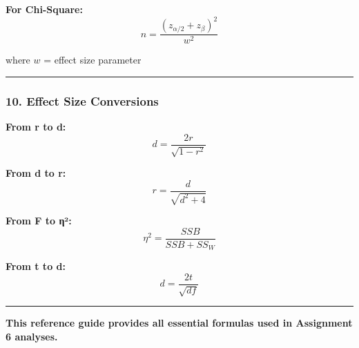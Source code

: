 \documentclass[11pt]{article}
\begin{document}
\textbf{For Chi-Square:} \[n = \frac{(z_{\alpha/2} + z_\beta)^2}{w^2}\]

where \(w\) = effect size parameter

\begin{center}\rule{0.5\linewidth}{0.5pt}\end{center}

\subsubsection{\texorpdfstring{\textbf{10. Effect Size
Conversions}}{10. Effect Size Conversions}}\label{effect-size-conversions}

\textbf{From r to d:} \[d = \frac{2r}{\sqrt{1-r^2}}\]

\textbf{From d to r:} \[r = \frac{d}{\sqrt{d^2 + 4}}\]

\textbf{From F to η²:} \[\eta^2 = \frac{SSB}{SSB + SS_W}\]

\textbf{From t to d:} \[d = \frac{2t}{\sqrt{df}}\]

\begin{center}\rule{0.5\linewidth}{0.5pt}\end{center}

\textbf{This reference guide provides all essential formulas used in
Assignment 6 analyses.}


    
    
    
\end{document}
